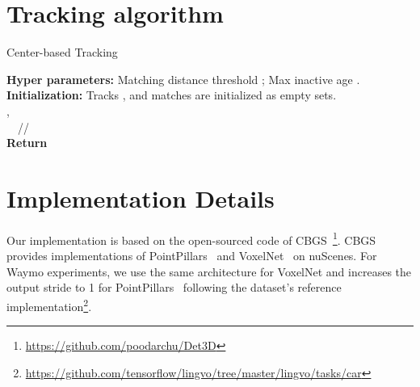 \documentclass[final]{cvpr}
\begin{document}
{\small


}

\clearpage
\appendix
\section{Tracking algorithm}

\begin{algorithm}
    \caption{{Center-based Tracking}}
	\label{alg:association}
	\SetAlgoLined
	  
    \textbf{Hyper parameters:} Matching distance threshold ; Max inactive age .\\
    \textbf{Initialization:} Tracks , and matches  are initialized as empty sets. \label{alg:st} \\
    ,  \\
	 \ \ //  \\
	\For{} {
	}
    \textbf{Return} 
\end{algorithm}

\section{Implementation Details}
Our implementation is based on the open-sourced code of CBGS~\cite{zhu2019classbalanced}\footnote{\url{https://github.com/poodarchu/Det3D}}.
CBGS provides implementations of PointPillars~\cite{pillar} and VoxelNet~\cite{voxelnet} on nuScenes. 
For Waymo experiments, we use the same architecture for VoxelNet and increases the output stride to 1 for PointPillars~\cite{pillar} following the dataset's reference implementation\footnote{\url{https://github.com/tensorflow/lingvo/tree/master/lingvo/tasks/car}}. 
\end{document}
